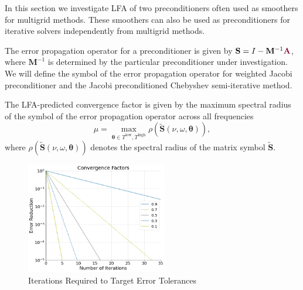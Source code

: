 In this section we investigate LFA of two preconditioners often used as smoothers for multigrid methods.
These smoothers can also be used as preconditioners for iterative solvers independently from multigrid methods.

The error propagation operator for a preconditioner is given by $\mathbf{S} = I - \mathbf{M}^{-1} {\color{burgundy}\mathbf{A}}$, where $\mathbf{M}^{-1}$ is determined by the particular preconditioner under investigation.
We will define the symbol of the error propagation operator for weighted Jacobi preconditioner and the Jacobi preconditioned Chebyshev semi-iterative method.

The LFA-predicted convergence factor is given by the maximum spectral radius of the symbol of the error propagation operator across all frequencies
\begin{equation}
\mu = \max_{\boldsymbol{\theta} \in T^{\text{low}}, T^{\text{high}}} \rho \left( \tilde{\mathbf{S}} \left( \nu, \omega, \boldsymbol{\theta} \right) \right),
\end{equation}
where $ \rho \left( \tilde{\mathbf{S}} \left( \nu, \omega, \boldsymbol{\theta} \right)\right)$ denotes the spectral radius of the matrix symbol $\tilde{\mathbf{S}}$.

\begin{figure}[!ht]
  \centering
  \includegraphics[width=0.55\textwidth]{../img/convergenceFactors}
  \caption{Iterations Required to Target Error Tolerances}
  \label{fig:error_tolerance}
\end{figure}

